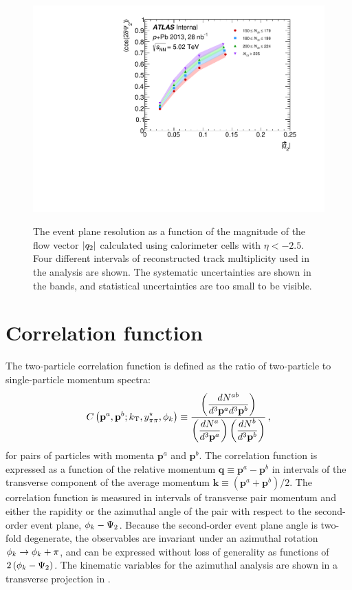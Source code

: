 \begin{figure}[t]
\centering
\includegraphics{epRes.pdf}\\
\caption{The event plane resolution as a function of the magnitude of the flow vector $|q_{2}|$ calculated using calorimeter cells with $\eta < -2.5$. Four different intervals of reconstructed track multiplicity \Nch used in the analysis are shown. The systematic uncertainties are shown in the bands, and statistical uncertainties are too small to be visible.}
\label{fig:ep_res}
\end{figure}


\section{Correlation function}
\label{sec:corr_func}
The two-particle correlation function is defined as the ratio of two-particle to single-particle momentum spectra:
\begin{equation} \label{eq:corr_deff}
  C\left(\mathbf{p}^a, \mathbf{p}^b; k_\mathrm{T}, y^{\star}_{\pi\pi}, \phi_{k}\right) \equiv \dfrac{\left(\dfrac{dN^{ab}}{d^3\mathbf{p}^a d^3\mathbf{p}^b}\right)}{\left(\dfrac{dN^{a}}{d^3\mathbf{p}^a}\right)\left(\dfrac{dN^{b}}{d^3\mathbf{p}^b}\right)} \,,
\end{equation}
for pairs of particles with momenta $\mathbf{p}^a$ and $\mathbf{p}^b$.
The correlation function is expressed as a function of the relative momentum $\mathbf{q} \equiv \mathbf{p}^a - \mathbf{p}^b$ in intervals of the transverse component \kt of the average momentum $\mathbf{k} \equiv \left(\mathbf{p}^a + \mathbf{p}^b\right)/2$.
The correlation function is measured in intervals of transverse pair momentum \kt and either the rapidity \kys or the azimuthal angle of the pair with respect to the second-order event plane, $\phi_{k}-\Psi_{2}$.
Because the second-order event plane angle is two-fold degenerate, the observables are invariant under an azimuthal rotation $\phi_{k} \rightarrow \phi_{k} + \pi$, and can be expressed without loss of generality as functions of $2\left(\phi_{k}-\Psi_{2}\right)$. %
The kinematic variables for the azimuthal analysis are shown in a transverse projection in \Fig{\ref{fig:transverse_q}}.

